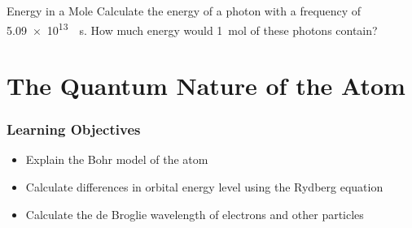 \documentclass[handout,notes=hide]{beamer}
\begin{document}
\begin{frame}[t]{Energy in a Mole}
	Calculate the energy of a photon with a
	frequency of \SI{5.09e13}{\per\second}. How much energy would
	\SI{1}{\mole} of these photons contain?

\end{frame}


\section{The Quantum Nature of the Atom}

\begin{frame}
	\frametitle{Learning Objectives}

	\begin{itemize}
		\item Explain the Bohr model of the atom
		\item Calculate differences in orbital energy level using the
			Rydberg equation
		\item Calculate the de Broglie wavelength of electrons and other
			particles
	\end{itemize}
\end{frame}
\end{document}
